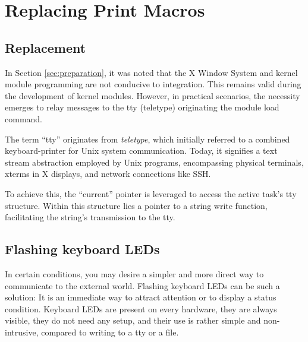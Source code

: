 \documentclass[10pt, oneside]{book}
\begin{document}
\section{Replacing Print Macros}
\label{sec:print_macros}
\subsection{Replacement}
In Section \ref{sec:preparation}, it was noted that the X Window System and kernel module programming are not conducive to integration.
This remains valid during the development of kernel modules.
However, in practical scenarios, the necessity emerges to relay messages to the tty (teletype) originating the module load command.

The term ``tty'' originates from \emph{teletype}, which initially referred to a combined keyboard-printer for Unix system communication.
Today, it signifies a text stream abstraction employed by Unix programs, encompassing physical terminals,
xterms in X displays, and network connections like SSH.

To achieve this, the ``current'' pointer is leveraged to access the active task's tty structure.
Within this structure lies a pointer to a string write function, facilitating the string's transmission to the tty.


\subsection{Flashing keyboard LEDs}
\label{sec:flash_kb_led}
In certain conditions, you may desire a simpler and more direct way to communicate to the external world.
Flashing keyboard LEDs can be such a solution: It is an immediate way to attract attention or to display a status condition.
Keyboard LEDs are present on every hardware, they are always visible, they do not need any setup, and their use is rather simple and non-intrusive, compared to writing to a tty or a file.
\end{document}
